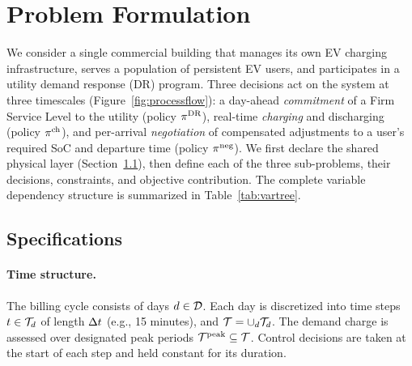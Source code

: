 \section{Problem Formulation}\label{sec:formulation}



We consider a single commercial building that manages its own EV charging infrastructure, serves a population of persistent EV users, and participates in a utility demand response (DR) program. Three decisions act on the system at three timescales (Figure~\ref{fig:processflow}): a day-ahead \emph{commitment} of a Firm Service Level to the utility (policy $\pi^{\mathrm{DR}}$), real-time \emph{charging} and discharging (policy $\pi^{\mathrm{ch}}$), and per-arrival \emph{negotiation} of compensated adjustments to a user's required SoC and departure time (policy $\pi^{\mathrm{neg}}$). We first declare the shared physical layer (Section~\ref{sec:specs}), then define each of the three sub-problems, their decisions, constraints, and objective contribution. 
The complete variable dependency structure is summarized in Table~\ref{tab:vartree}.








\subsection{Specifications}\label{sec:specs}

\paragraph{Time structure.} The billing cycle consists of days $d \in \mathcal{D}$. Each day is discretized into time steps $t \in \mathcal{T}_{d}$ of length $\Delta t$ (e.g., 15 minutes), and $\mathcal{T} = \cup_d \mathcal{T}_{d}$. The demand charge is assessed over designated peak periods $\mathcal{T}^{\mathrm{peak}} \subseteq \mathcal{T}$. Control decisions are taken at the start of each step and held constant for its duration.

